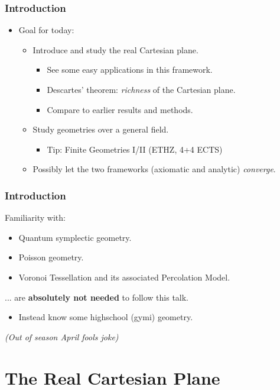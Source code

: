 \documentclass[compress,mathserif,serif]{beamer}
\begin{document}
\begin{frame}
\frametitle{Introduction}
\begin{itemize}
\item Goal for today:
\pause
\begin{itemize}
\item Introduce and study the real Cartesian plane.
\pause
\begin{itemize}
\item See some easy applications in this framework.
\pause
\item Descartes' theorem: \textit{richness} of the Cartesian plane.
\pause
\item Compare to earlier results and methods.
\end{itemize}
\pause
\item Study geometries over a general field.
\pause
\begin{itemize}
\item Tip: Finite Geometries I/II (ETHZ, 4+4 ECTS)
\end{itemize}
\pause
\item Possibly let the two frameworks (axiomatic and analytic) \textit{converge}. 
\end{itemize}
\end{itemize}
\end{frame}


\begin{frame}
\frametitle{Introduction}
Familiarity with:
\pause
\begin{itemize}
\item Quantum symplectic geometry.
\pause
\item Poisson geometry.
\pause
\item Voronoi Tessellation and its associated Percolation Model.
\end{itemize}
\pause
... are \textbf{absolutely not needed} to follow this talk. 
\pause
\begin{itemize}
\item Instead know some highschool (gymi) geometry.
\end{itemize}
\pause \textit{(Out of season April fools joke)}
\end{frame}

\section{The Real Cartesian Plane}

\begin{frame}
\begin{center}
\Huge{}
\end{center}
\end{frame}
\end{document}
